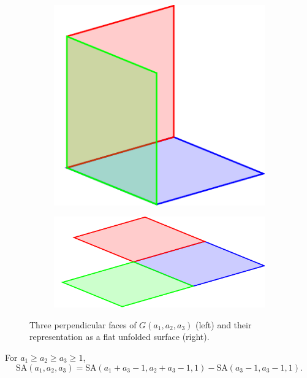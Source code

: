 \begin{figure}[]
\centering
\hspace*{\fill}
\begin{subfigure}[b]{0.22\textwidth}
	\includegraphics[width=\textwidth]{figures/3/manifold_a.pdf}
	\label{fig:manifold_a}
\end{subfigure} \hfill
\begin{subfigure}[b]{0.35\textwidth}
	\includegraphics[width=\textwidth]{figures/3/manifold_flat.pdf}
	\label{fig:manifold_b}
\end{subfigure}
\hspace*{\fill}
\caption{Three perpendicular faces of $G(a_1,a_2,a_3)$ (left) and their representation as a flat unfolded surface (right).}
\label{fig:manifold_types}
\end{figure} 

\begin{lem}
\label{lem:unfolded_cube}
For $a_1 \geq a_2 \geq a_3 \geq 1$, 
$$\text{SA}(a_1, a_2, a_3) = \text{SA}(a_1+a_3-1, a_2+a_3-1, 1) - \text{SA}(a_3-1, a_3-1, 1).$$
\end{lem}

